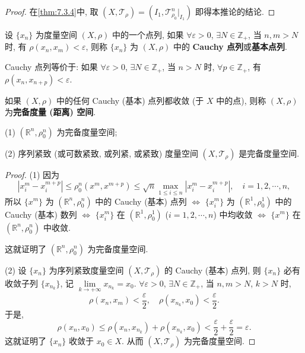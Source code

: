 \begin{proof}
在\cref{thm:7.3.4}中, 取 $(X, \mathcal{T}_{\rho}) = (I_{1}, \mathcal{T}_{\rho_{0}}^{n}|_{I_{1}})$ 即得本推论的结论.
\end{proof}

\begin{definition}\label{def:7.3.1}
设 $\{x_{n}\}$ 为度量空间 $(X, \rho)$ 中的一个点列, 如果 $\forall \varepsilon > 0$, $\exists N \in \mathbb{Z}_{+}$, 当 $n, m > N$ 时, 有 $\rho(x_{n}, x_{m}) < \varepsilon$, 则称 $\{x_{n}\}$ 为 $(X, \rho)$ 中的 \textbf{Cauchy 点列}或\textbf{基本点列}.

Cauchy 点列等价于: 如果 $\forall \varepsilon > 0$, $\exists N \in \mathbb{Z}_{+}$, 当 $n > N$ 时, $\forall p \in \mathbb{Z}_{+}$, 有 $\rho(x_{n}, x_{n+p}) < \varepsilon$.

如果 $(X, \rho)$ 中的任何 Cauchy (基本) 点列都收敛 (于 $X$ 中的点), 则称 $(X, \rho)$ 为\textbf{完备度量 (距离) 空间}.
\end{definition}

\begin{theorem}\label{thm:7.3.5}
(1) $(\mathbb{R}^{n}, \rho_{0}^{n})$ 为完备度量空间;

(2) 序列紧致 (或可数紧致, 或列紧, 或紧致) 度量空间 $(X, \mathcal{T}_{\rho})$ 是完备度量空间.
\end{theorem}

\begin{proof}
(1) 因为
\[
  |x_{i}^{m} - x_{i}^{m+p}| \leqslant \rho_{0}^{n}(x^{m}, x^{m+p}) \leqslant \sqrt{n} \max_{1 \leqslant i \leqslant n} |x_{i}^{m} - x_{i}^{m+p}|, \quad i = 1, 2, \cdots, n,
\]
所以 $\{x^{m}\}$ 为 $(\mathbb{R}^{n}, \rho_{0}^{n})$ 中的 Cauchy (基本) 点列 $\iff$ $\{x_{i}^{m}\}$ 为 $(\mathbb{R}^{1}, \rho_{0}^{1})$ 中的 Cauchy (基本) 数列 $\iff$ $\{x_{i}^{m}\}$ 在 $(\mathbb{R}^{1}, \rho_{0}^{1})$ ($i = 1, 2, \cdots, n$) 中均收敛 $\iff$ $\{x^{m}\}$ 在 $(\mathbb{R}^{n}, \rho_{0}^{n})$ 中收敛.

这就证明了 $(\mathbb{R}^{n}, \rho_{0}^{n})$ 为完备度量空间.

(2) 设 $\{x_{n}\}$ 为序列紧致度量空间 $(X, \mathcal{T}_{\rho})$ 的 Cauchy (基本) 点列, 则 $\{x_{n}\}$ 必有收敛子列 $\{x_{n_{k}}\}$, 记 $\lim\limits_{k \to +\infty} x_{n_{k}} = x_{0}$. $\forall \varepsilon > 0$, $\exists N \in \mathbb{Z}_{+}$, 当 $n, m > N$, $k > N$ 时,
\[
  \rho(x_{n}, x_{m}) < \frac{\varepsilon}{2}, \quad \rho(x_{n_{k}}, x_{0}) < \frac{\varepsilon}{2}.
\]
于是,
\[
  \rho(x_{n}, x_{0}) \leqslant \rho(x_{n}, x_{n_{k}}) + \rho(x_{n_{k}}, x_{0}) < \frac{\varepsilon}{2} + \frac{\varepsilon}{2} = \varepsilon.
\]
这就证明了 $\{x_{n}\}$ 收敛于 $x_{0} \in X$. 从而 $(X, \mathcal{T}_{\rho})$ 为完备度量空间.
\end{proof}

